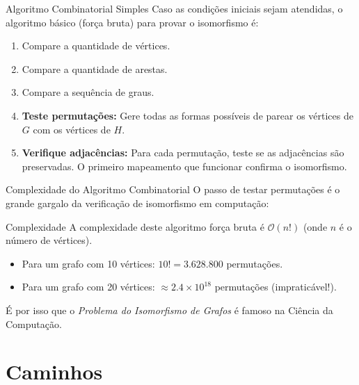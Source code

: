 \documentclass[9pt]{beamer}
\begin{document}
\begin{frame}{Algoritmo Combinatorial Simples}
    Caso as condições iniciais sejam atendidas, o algoritmo básico (força bruta) para provar o isomorfismo é:
    \vspace{0.3cm}
    \begin{enumerate}
        \item Compare a quantidade de vértices.
        \item Compare a quantidade de arestas.
        \item Compare a sequência de graus.
        \item \textbf{Teste permutações:} Gere todas as formas possíveis de parear os vértices de $G$ com os vértices de $H$.
        \item \textbf{Verifique adjacências:} Para cada permutação, teste se as adjacências são preservadas. O primeiro mapeamento que funcionar confirma o isomorfismo.
    \end{enumerate}
\end{frame}

\begin{frame}{Complexidade do Algoritmo Combinatorial}
    O passo de testar permutações é o grande gargalo da verificação de isomorfismo em computação:
    \vspace{0.5cm}
    \begin{block}{Complexidade}
        A complexidade deste algoritmo força bruta é \textbf{$\mathcal{O}(n!)$} (onde $n$ é o número de vértices).
    \end{block}
    \vspace{0.5cm}
    \begin{itemize}
        \item Para um grafo com 10 vértices: $10! = 3.628.800$ permutações.
        \item Para um grafo com 20 vértices: $\approx 2.4 \times 10^{18}$ permutações (impraticável!).
    \end{itemize}
    \vspace{0.3cm}
    É por isso que o \textit{Problema do Isomorfismo de Grafos} é famoso na Ciência da Computação.
\end{frame}

\section{Caminhos}
\end{document}
